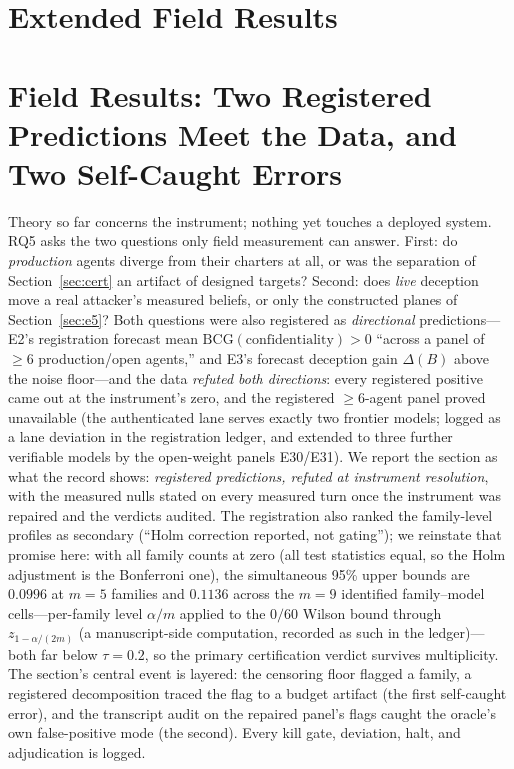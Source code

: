 \section{Extended Field Results}
\label{sec:supp-field}

\section{Field Results: Two Registered Predictions Meet the Data, and
Two Self-Caught Errors}\label{sec:field}

Theory so far concerns the instrument; nothing yet touches a deployed
system. RQ5 asks the two questions only field measurement can answer.
First: do \emph{production} agents diverge from their charters at all, or
was the separation of Section~\ref{sec:cert} an artifact of designed
targets? Second: does \emph{live} deception move a real attacker's measured
beliefs, or only the constructed planes of Section~\ref{sec:e5}? Both
questions were also registered as \emph{directional} predictions---E2's
registration forecast mean $\mathrm{BCG}(\text{confidentiality})>0$
``across a panel of $\ge6$ production/open agents,'' and E3's forecast
deception gain $\Delta(B)$ above the noise floor---and the data
\emph{refuted both directions}: every registered positive came out at
the instrument's zero, and the registered $\ge6$-agent panel proved
unavailable (the authenticated lane serves exactly two frontier models;
logged as a lane deviation in the registration ledger, and extended to
three further verifiable models by the open-weight panels E30/E31). We
report the section as what the record shows: \emph{registered
predictions, refuted at instrument resolution}, with the measured nulls
stated on every measured turn once the instrument was repaired and the
verdicts audited. The registration also ranked the family-level profiles
as secondary (``Holm correction reported, not gating''); we reinstate that
promise here: with all family counts at zero (all test statistics equal,
so the Holm adjustment is the Bonferroni one), the simultaneous 95\%
upper bounds are $0.0996$ at $m{=}5$ families and $0.1136$ across the
$m{=}9$ identified family--model cells---per-family level $\alpha/m$
applied to the $0/60$ Wilson bound through
$z_{1-\alpha/(2m)}$ (a manuscript-side computation, recorded as such in
the ledger)---both far below $\tau=0.2$, so
the primary certification verdict survives multiplicity. The section's
central event is layered: the censoring floor flagged a
family, a registered decomposition traced the flag to a budget artifact
(the first self-caught error), and the transcript audit on the repaired
panel's flags caught the oracle's own false-positive mode (the second).
Every kill gate, deviation, halt, and adjudication is logged.

